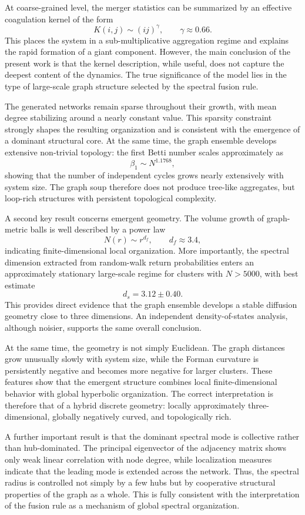 \documentclass[11pt]{article}
\begin{document}
At coarse-grained level, the merger statistics can be summarized by an effective coagulation kernel of the form
\[
K(i,j)\sim (ij)^\gamma,
\qquad
\gamma \approx 0.66.
\]
This places the system in a sub-multiplicative aggregation regime and explains the rapid formation of a giant component.
However, the main conclusion of the present work is that the kernel description, while useful, does not capture the deepest content of the dynamics.
The true significance of the model lies in the type of large-scale graph structure selected by the spectral fusion rule.

The generated networks remain sparse throughout their growth, with mean degree stabilizing around a nearly constant value.
This sparsity constraint strongly shapes the resulting organization and is consistent with the emergence of a dominant structural core.
At the same time, the graph ensemble develops extensive non-trivial topology:
the first Betti number scales approximately as
\[
\beta_1 \sim N^{1.1768},
\]
showing that the number of independent cycles grows nearly extensively with system size.
The graph soup therefore does not produce tree-like aggregates, but loop-rich structures with persistent topological complexity.

A second key result concerns emergent geometry.
The volume growth of graph-metric balls is well described by a power law
\[
N(r)\sim r^{d_f},
\qquad
d_f \approx 3.4,
\]
indicating finite-dimensional local organization.
More importantly, the spectral dimension extracted from random-walk return probabilities enters an approximately stationary large-scale regime for clusters with $N>5000$, with best estimate
\[
d_s = 3.12 \pm 0.40.
\]
This provides direct evidence that the graph ensemble develops a stable diffusion geometry close to three dimensions.
An independent density-of-states analysis, although noisier, supports the same overall conclusion.

At the same time, the geometry is not simply Euclidean.
The graph distances grow unusually slowly with system size, while the Forman curvature is persistently negative and becomes more negative for larger clusters.
These features show that the emergent structure combines local finite-dimensional behavior with global hyperbolic organization.
The correct interpretation is therefore that of a hybrid discrete geometry:
locally approximately three-dimensional, globally negatively curved, and topologically rich.

A further important result is that the dominant spectral mode is collective rather than hub-dominated.
The principal eigenvector of the adjacency matrix shows only weak linear correlation with node degree, while localization measures indicate that the leading mode is extended across the network.
Thus, the spectral radius is controlled not simply by a few hubs but by cooperative structural properties of the graph as a whole.
This is fully consistent with the interpretation of the fusion rule as a mechanism of global spectral organization.
\end{document}
